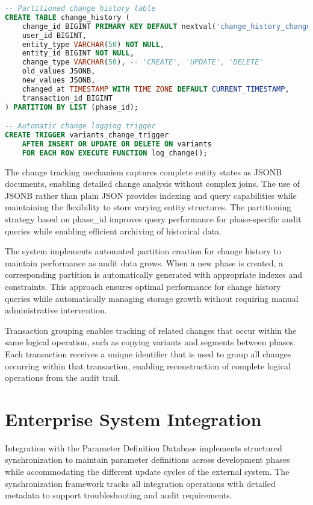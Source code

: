 \begin{lstlisting}[language=SQL, caption={Change Tracking Implementation}, label={lst:change-tracking}]
-- Partitioned change history table
CREATE TABLE change_history (
    change_id BIGINT PRIMARY KEY DEFAULT nextval('change_history_change_id_seq'),
    user_id BIGINT,
    entity_type VARCHAR(50) NOT NULL,
    entity_id BIGINT NOT NULL,
    change_type VARCHAR(50), -- 'CREATE', 'UPDATE', 'DELETE'
    old_values JSONB,
    new_values JSONB,
    changed_at TIMESTAMP WITH TIME ZONE DEFAULT CURRENT_TIMESTAMP,
    transaction_id BIGINT
) PARTITION BY LIST (phase_id);

-- Automatic change logging trigger
CREATE TRIGGER variants_change_trigger
    AFTER INSERT OR UPDATE OR DELETE ON variants
    FOR EACH ROW EXECUTE FUNCTION log_change();
\end{lstlisting}

The change tracking mechanism captures complete entity states as JSONB documents, enabling detailed change analysis without complex joins. The use of JSONB rather than plain JSON provides indexing and query capabilities while maintaining the flexibility to store varying entity structures. The partitioning strategy based on phase\_id improves query performance for phase-specific audit queries while enabling efficient archiving of historical data.

The system implements automated partition creation for change history to maintain performance as audit data grows. When a new phase is created, a corresponding partition is automatically generated with appropriate indexes and constraints. This approach ensures optimal performance for change history queries while automatically managing storage growth without requiring manual administrative intervention.

Transaction grouping enables tracking of related changes that occur within the same logical operation, such as copying variants and segments between phases. Each transaction receives a unique identifier that is used to group all changes occurring within that transaction, enabling reconstruction of complete logical operations from the audit trail.

\section{Enterprise System Integration}
\label{sec:enterprise-integration}

Integration with the Parameter Definition Database implements structured synchronization to maintain parameter definitions across development phases while accommodating the different update cycles of the external system. The synchronization framework tracks all integration operations with detailed metadata to support troubleshooting and audit requirements.

